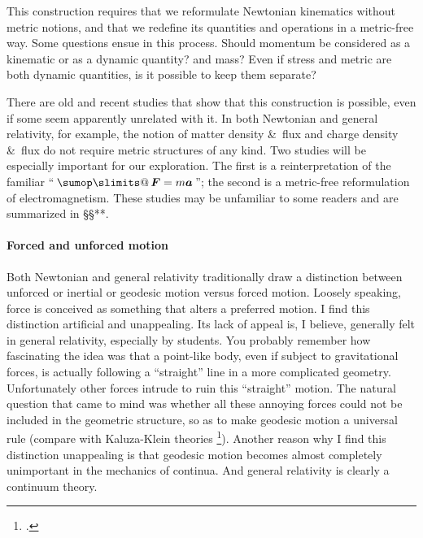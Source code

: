 \documentclass[\ifafour a4paper,12pt,\else a5paper,10pt,\fi%
onecolumn,oneside,article,%
british%
]{memoir}
\makeatletter
\theoremstyle{remark}
\theoremstyle{innote}
\def\sum{\DOTSI\sumop\slimits@}
\newcommand*{\citep}{\footcites}
\newcommand*{\amp}{\&}
\renewcommand*{\|}[1][]{\nonscript\,#1\vert\nonscript\;\mathopen{}}
\newcommand*{\sects}{\S\S}%
\newcommand*{\tsum}{\mathop{\textstyle\sum}\nolimits}
\makeatother
\begin{document}
This construction requires that we reformulate Newtonian kinematics without
metric notions, and that we redefine its quantities and operations in a
metric-free way. Some questions ensue in this process. Should momentum be
considered as a kinematic or as a dynamic quantity? and mass? Even if
stress and metric are both dynamic quantities, is it possible to keep them
separate?

There are old and recent studies that show that this construction is
possible, even if some seem apparently unrelated with it. In both Newtonian
and general relativity, for example, the notion of matter density \amp\
flux and charge density \amp\ flux do not require metric structures of any
kind. %
Two studies will be especially important for our exploration. The first is
a reinterpretation of the familiar \enquote{\,$\tsum\bm{F} = m\bm{a}$\,};
the second is a metric-free reformulation of electromagnetism. These
studies may be unfamiliar to some readers and are summarized in \sects***.


\paragraph{Forced and unforced motion}

Both Newtonian and general relativity traditionally draw a distinction
between unforced or inertial or geodesic motion versus forced motion.
Loosely speaking, force is conceived as something that alters a preferred
motion. I find this distinction artificial and unappealing. Its lack of
appeal is, I believe, generally felt in general relativity, especially by
students. You probably remember how fascinating the idea was that a
point-like body, even if subject to gravitational forces, is actually
following a \enquote{straight} line in a more complicated geometry.
Unfortunately other forces intrude to ruin this \enquote{straight} motion.
The natural question that came to mind was whether all these annoying
forces could not be included in the geometric structure, so as to make
geodesic motion a universal rule (compare with Kaluza-Klein theories
\citep{kaluza1921,goenner2004,goenner2012,verbinetal2005}). Another reason
why I find this distinction unappealing is that geodesic motion becomes
almost completely unimportant in the mechanics of continua. And general
relativity is clearly a continuum theory.
\end{document}
